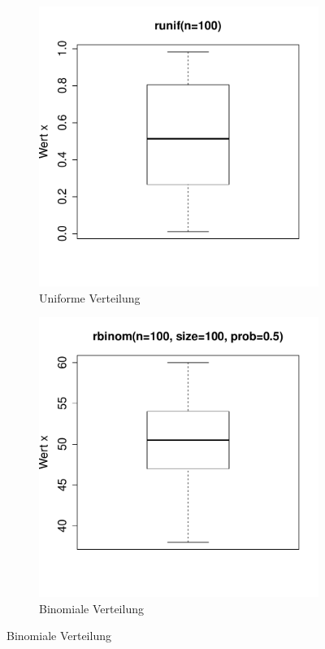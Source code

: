 \begin{figure}[h!]
\centering
\begin{subfigure}[b]{0.48\textwidth}
\includegraphics{r-cmd-031}
\caption{Uniforme Verteilung}
\end{subfigure}
\begin{subfigure}[b]{0.48\textwidth}
\includegraphics{r-cmd-032}
\caption{Binomiale Verteilung}
\end{subfigure}


\end{figure}
